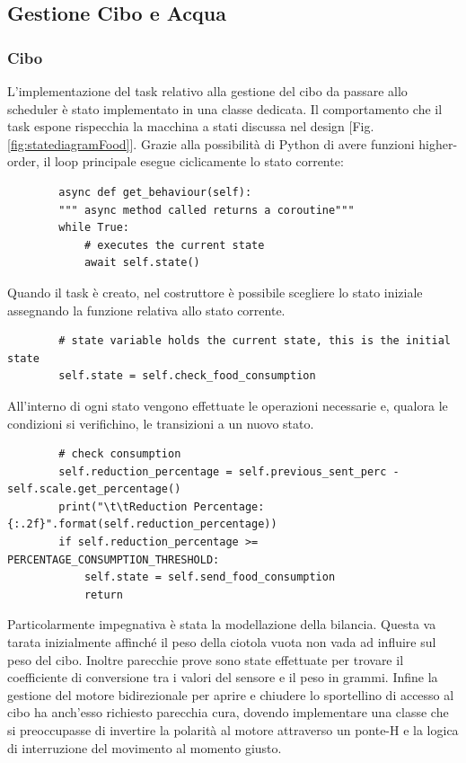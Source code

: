 \subsection{Gestione Cibo e Acqua}
    \subsubsection{Cibo}
    L'implementazione del task relativo alla gestione del cibo da passare allo scheduler è stato implementato in una classe dedicata. Il comportamento che il task espone rispecchia la macchina a stati discussa nel design [Fig. \ref{fig:statediagramFood}]. Grazie alla possibilità di Python di avere funzioni higher-order, il loop principale esegue ciclicamente lo stato corrente:
    
    \begin{lstlisting}
        async def get_behaviour(self):
        """ async method called returns a coroutine"""
        while True:
            # executes the current state
            await self.state()
    \end{lstlisting}
    Quando il task è creato, nel costruttore è possibile scegliere lo stato iniziale assegnando la funzione relativa allo stato corrente. 
    \begin{lstlisting}
        # state variable holds the current state, this is the initial state
        self.state = self.check_food_consumption
    \end{lstlisting}
    All'interno di ogni stato vengono effettuate le operazioni necessarie e, qualora le condizioni si verifichino, le transizioni a un nuovo stato.
    \begin{lstlisting} 
        # check consumption
        self.reduction_percentage = self.previous_sent_perc - self.scale.get_percentage()
        print("\t\tReduction Percentage: {:.2f}".format(self.reduction_percentage))
        if self.reduction_percentage >= PERCENTAGE_CONSUMPTION_THRESHOLD:
            self.state = self.send_food_consumption
            return
    \end{lstlisting}
    Particolarmente impegnativa è stata la modellazione della bilancia. Questa va tarata inizialmente affinché il peso della ciotola vuota non vada ad influire sul peso del cibo. Inoltre parecchie prove sono state effettuate per trovare il coefficiente di conversione tra i valori del sensore e il peso in grammi.
    Infine la gestione del motore bidirezionale per aprire e chiudere lo sportellino di accesso al cibo ha anch'esso richiesto parecchia cura, dovendo implementare una classe che si preoccupasse di invertire la polarità al motore attraverso un ponte-H e la logica di interruzione del movimento al momento giusto. 
    
